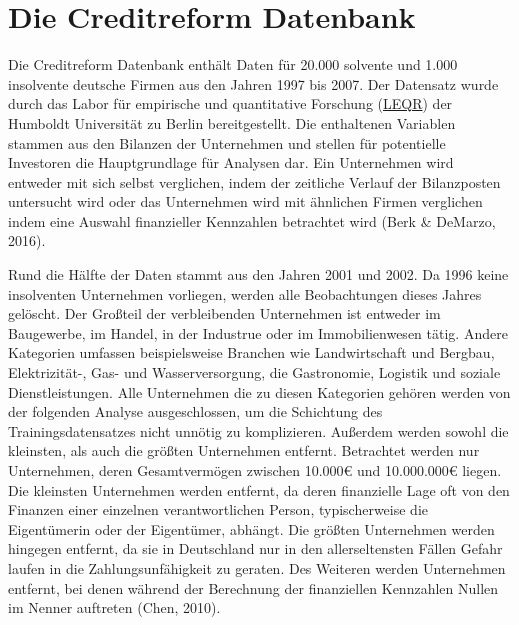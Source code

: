 \documentclass{article}
\begin{document}
\section{Die Creditreform Datenbank}

Die Creditreform Datenbank enth{\"a}lt Daten f{\"u}r 20.000 solvente und 1.000 insolvente deutsche Firmen aus den Jahren 1997 bis 2007. Der Datensatz wurde durch das Labor f{\"u}r empirische und quantitative Forschung (\href{https://leqr.wiwi.hu-berlin.de/leqr/content/databaseInformation/creditreform/creditreform.htm}{LEQR}) der Humboldt Universit{\"a}t zu Berlin bereitgestellt. Die enthaltenen Variablen stammen aus den Bilanzen der Unternehmen und stellen f{\"u}r potentielle Investoren die Hauptgrundlage f{\"u}r Analysen dar. Ein Unternehmen wird entweder mit sich selbst verglichen, indem der zeitliche Verlauf der Bilanzposten untersucht wird oder das Unternehmen wird mit {\"a}hnlichen Firmen verglichen indem eine Auswahl finanzieller Kennzahlen betrachtet wird (Berk \& DeMarzo, 2016).

Rund die H{\"a}lfte der Daten stammt aus den Jahren 2001 und 2002. Da 1996 keine insolventen Unternehmen vorliegen, werden alle Beobachtungen dieses Jahres gel{\"o}scht. Der Gro{\ss}teil der verbleibenden Unternehmen ist entweder im Baugewerbe, im Handel, in der Industrue oder im Immobilienwesen t{\"a}tig. Andere Kategorien umfassen beispielsweise Branchen wie Landwirtschaft und Bergbau, Elektrizit{\"a}t-, Gas- und Wasserversorgung, die Gastronomie, Logistik und soziale Dienstleistungen. Alle Unternehmen die zu diesen Kategorien geh{\"o}ren werden von der folgenden Analyse ausgeschlossen, um die Schichtung des Trainingsdatensatzes nicht unn{\"o}tig zu komplizieren. Au{\ss}erdem werden sowohl die kleinsten, als auch die gr{\"o}{\ss}ten Unternehmen entfernt. Betrachtet werden nur Unternehmen, deren Gesamtverm{\"o}gen zwischen 10.000€ und 10.000.000€ liegen. Die kleinsten Unternehmen werden entfernt, da deren finanzielle Lage oft von den Finanzen einer einzelnen verantwortlichen Person, typischerweise die Eigent{\"u}merin oder der Eigent{\"u}mer, abh{\"a}ngt. Die gr{\"o}{\ss}ten Unternehmen werden hingegen entfernt, da sie in Deutschland nur in den allerseltensten F{\"a}llen Gefahr laufen in die Zahlungsunf{\"a}higkeit zu geraten. Des Weiteren werden Unternehmen entfernt, bei denen w{\"a}hrend der Berechnung der finanziellen Kennzahlen Nullen im Nenner auftreten (Chen, 2010).
\end{document}
